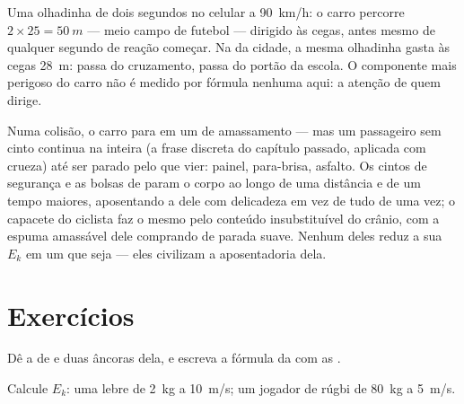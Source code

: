 \begin{example}\label{ex:g9:kinetic-energy-safety:glance}
Uma olhadinha de dois segundos no celular a \qty{90}{km/h}: o carro
percorre $2 \times 25 = \qty{50}{m}$ --- meio campo de futebol ---
dirigido às cegas, antes mesmo de qualquer segundo de reação começar.
Na  da cidade, a mesma olhadinha gasta às cegas
\qty{28}{m}: passa do cruzamento, passa do portão da escola. O
componente mais perigoso do carro não é medido por fórmula nenhuma
aqui: a atenção de quem dirige.
\end{example}

\begin{remark}\label{rem:g9:kinetic-energy-safety:belts}
Numa colisão, o carro para em um  de amassamento --- mas um
passageiro sem cinto continua na  inteira (a frase discreta
do capítulo passado, aplicada com crueza) até ser parado pelo que
vier: painel, para-brisa, asfalto. Os cintos de segurança e as bolsas
de  param o corpo ao longo de uma distância e de um tempo maiores,
aposentando a  dele com delicadeza em vez de tudo de
uma vez; o capacete do ciclista faz o mesmo pelo conteúdo
insubstituível do crânio, com a espuma amassável dele comprando
 de parada suave. Nenhum deles reduz a sua $E_k$ em um
 que seja --- eles civilizam a aposentadoria dela.
\end{remark}

\section{Exercícios}

\begin{exercise}[$\star$]\label{exo:g9:kinetic-energy-safety:1}
Dê a  de  e duas âncoras dela, e escreva a fórmula da
 com as .
\end{exercise}

\begin{exercise}[$\star$]\label{exo:g9:kinetic-energy-safety:2}
Calcule $E_k$: uma lebre de \qty{2}{kg} a \qty{10}{m/s}; um jogador
de rúgbi de \qty{80}{kg} a \qty{5}{m/s}.
\end{exercise}

